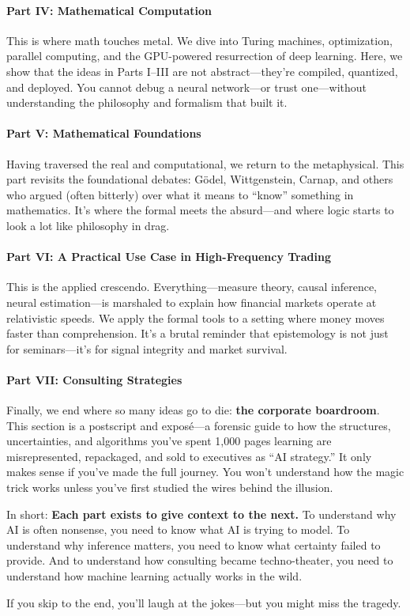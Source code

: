 \paragraph{Part IV: Mathematical Computation}
This is where math touches metal. We dive into Turing machines, optimization, parallel computing, and the GPU-powered resurrection of deep learning. Here, we show that the ideas in Parts I–III are not abstract—they’re compiled, quantized, and deployed. You cannot debug a neural network—or trust one—without understanding the philosophy and formalism that built it.

\paragraph{Part V: Mathematical Foundations}
Having traversed the real and computational, we return to the metaphysical. This part revisits the foundational debates: Gödel, Wittgenstein, Carnap, and others who argued (often bitterly) over what it means to “know” something in mathematics. It’s where the formal meets the absurd—and where logic starts to look a lot like philosophy in drag.

\paragraph{Part VI: A Practical Use Case in High-Frequency Trading}
This is the applied crescendo. Everything—measure theory, causal inference, neural estimation—is marshaled to explain how financial markets operate at relativistic speeds. We apply the formal tools to a setting where money moves faster than comprehension. It's a brutal reminder that epistemology is not just for seminars—it's for signal integrity and market survival.

\paragraph{Part VII: Consulting Strategies}
Finally, we end where so many ideas go to die: \textbf{the corporate boardroom}. This section is a postscript and exposé—a forensic guide to how the structures, uncertainties, and algorithms you've spent 1,000 pages learning are misrepresented, repackaged, and sold to executives as “AI strategy.” It only makes sense if you've made the full journey. You won’t understand how the magic trick works unless you’ve first studied the wires behind the illusion.

\bigskip

In short: \textbf{Each part exists to give context to the next.} To understand why AI is often nonsense, you need to know what AI is trying to model. To understand why inference matters, you need to know what certainty failed to provide. And to understand how consulting became techno-theater, you need to understand how machine learning actually works in the wild.

If you skip to the end, you’ll laugh at the jokes—but you might miss the tragedy.

